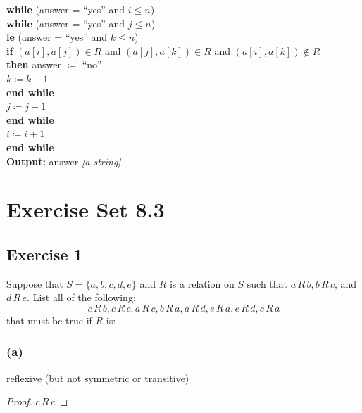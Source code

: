 \documentclass[14pt]{extarticle}
\begin{document}
\begin{tcolorbox}[colframe=cyan]
        \begin{tabbing}
                {\bf whi}\= {\bf le} (answer = ``yes'' and \(i \leq n\)) \\
                \> {\bf whi}\={\bf le} (answer = ``yes'' and \(j \leq n\)) \\
                \>          \={\bf le} (answer = ``yes'' and \(k \leq n\)) \\
                \>          \>         \> {\bf if} \((a[i], a[j]) \in R\) and \((a[j], a[k]) \in R\) and \((a[i], a[k]) \notin R\) \\
                \>          \>         \>  {\bf then} answer \(\coloneqq\) ``no'' \\
                \>           \>        \> \(k \coloneqq k+1\) \\
                \>           \> {\bf end while} \\
                \>           \> \(j \coloneqq j+1\) \\
                \> {\bf end while} \\
                \>  \(i \coloneqq i+1\) \\
                {\bf end while} \\
                {\bf Output:} answer {\it [a string]}
        \end{tabbing}
\end{tcolorbox}

\section{Exercise Set 8.3}

\subsection{Exercise 1}
Suppose that \(S = \{a, b, c, d, e\}\) and $R$ is a relation on $S$ such that \(a \,R\, b, b \,R\, c\), and
\(d \,R\, e\). List all of the following:
\[
        c\,R\,b, c\,R\,c, a\,R\,c, b\,R\,a, a\,R\,d, e\,R\,a, e\,R\,d, c\,R\,a
\]
that must be true if $R$ is:

\subsubsection{(a)}
reflexive (but not symmetric or transitive)
\begin{proof}
        \(c \,R\, c\)

\end{proof}
\end{document}
